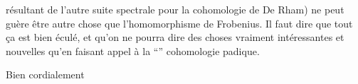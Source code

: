 résultant de l'autre suite spectrale pour la cohomologie de De Rham) ne peut guère être autre chose que l'homomorphisme de Frobenius. Il faut dire que tout ça est bien éculé, et qu'on ne pourra dire  des choses vraiment intéressantes et nouvelles qu'en faisant appel à la ``'' cohomologie p\unsure{-}adique.

Bien cordialement
